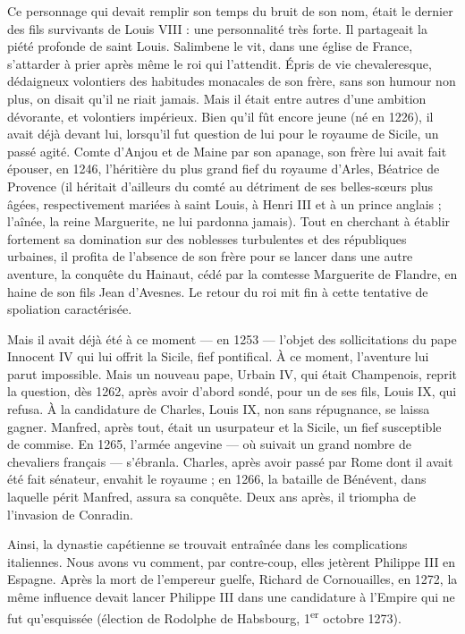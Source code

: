 \documentclass[french,twoside]{book} %
\begin{document}
Ce personnage qui devait remplir son temps du bruit de son nom, était le dernier des fils survivants de Louis VIII : une personnalité très forte. Il partageait la piété profonde de saint Louis. Salimbene le vit, dans une église de France, s’attarder à prier après même le roi qui l’attendit. Épris de vie chevaleresque, dédaigneux volontiers des habitudes monacales de son frère, sans son humour non plus, on disait qu’il ne riait jamais. Mais il était entre autres d’une ambition dévorante, et volontiers impérieux. Bien qu’il fût encore jeune (né en 1226), il avait déjà devant lui, lorsqu’il fut question de lui pour le royaume de Sicile, un passé agité. Comte d’Anjou et de Maine par son apanage, son frère lui avait fait épouser, en 1246, l’héritière du plus grand fief du royaume d’Arles, Béatrice de Provence (il héritait d’ailleurs du comté au détriment de ses belles-sœurs plus âgées, respectivement mariées à saint Louis, à Henri III et à un prince anglais ; l’aînée, la reine Marguerite, ne lui pardonna jamais). Tout en cherchant à établir fortement sa domination sur des noblesses turbulentes et des républiques urbaines, il profita de l’absence de son frère pour se lancer dans une autre aventure, la conquête du Hainaut, cédé par la comtesse Marguerite de Flandre, en haine de son fils Jean d’Avesnes. Le retour du roi mit fin à cette tentative de spoliation caractérisée.\par
Mais il avait déjà été à ce moment — en 1253 — l’objet des sollicitations du pape Innocent IV qui lui offrit la Sicile, fief pontifical. À ce moment, l’aventure lui parut impossible. Mais un nouveau pape, Urbain IV, qui était Champenois, reprit la question, dès 1262, après avoir d’abord sondé, pour un de ses fils, Louis IX, qui refusa. À la candidature de Charles, Louis IX, non sans répugnance, se laissa gagner. Manfred, après tout, était un usurpateur et la Sicile, un fief susceptible de commise. En 1265, l’armée angevine — où suivait un grand nombre de chevaliers français — s’ébranla. Charles, après avoir passé par Rome dont il avait été fait sénateur, envahit le royaume ; en 1266, la bataille de Bénévent, dans laquelle périt Manfred, assura sa conquête. Deux ans après, il triompha de l’invasion de Conradin.\par
Ainsi, la dynastie capétienne se trouvait entraînée dans les complications italiennes. Nous avons vu comment, par contre-coup, elles jetèrent Philippe III en Espagne. Après la mort de l’empereur guelfe, Richard de Cornouailles, en 1272, la même influence devait lancer Philippe III dans une candidature à l’Empire qui ne fut qu’esquissée (élection de Rodolphe de Habsbourg, 1\textsuperscript{er} octobre 1273).\par
\end{document}
